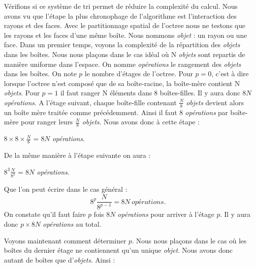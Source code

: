 Vérifions si ce système de tri permet de réduire la complexité du calcul. Nous avons vu que l'étape la plus chronophage de l'algorithme est l'interaction des rayons et des faces. Avec le partitionnage spatial de l'\gls{octree} nous ne testons que les rayons et les faces d'une même boîte. Nous nommons \textit{objet} : un rayon ou une face. Dans un premier temps, voyons la complexité de la répartition des \textit{objets} dans les boîtes. Nous nous plaçons dans le cas idéal où N \textit{objets} sont repartis de manière uniforme dans l'espace. On nomme \textit{opérations} le rangement des \textit{objets} dans les boîtes. On note $p$ le nombre d'étages de l'\gls{octree}. Pour $p=0$, c'est à dire lorsque l'\gls{octree} n'est composé que de sa boîte-racine, la boîte-mère contient N \textit{objets}. Pour $p=1$ il faut ranger N éléments dans 8 boîtes-filles. Il y aura donc $8N$ \textit{opérations}. A l'étage suivant, chaque boîte-fille contenant $\frac{N}{8}$ \textit{objets} devient alors un boîte mère traitée comme précédemment. Ainsi il faut $8$ \textit{opérations} par boîte-mère pour ranger leurs $\frac{N}{8}$ \textit{objets}. Nous avons donc à cette étape :
%
\begin{center}
$8\times 8\times \frac{N}{8}$ = $8N$ \textit{opérations}.
\end{center}
%
De la même manière à l'étape suivante on aura :
\begin{center}
$8^3\frac{N}{8^2}$ = $8N$ \textit{opérations}.
\end{center}
%
Que l'on peut écrire dans le cas général :
\begin{equation} \label{operation}
8^p\frac{N}{8^{p-1}} = 8N \ \textit{opérations}.
\end{equation}
%
On constate qu'il faut faire $p$ fois $8N$ \textit{opérations} pour arriver à l'étage $p$. Il y aura donc $p \times 8N$ \textit{opérations} au total. %

Voyons maintenant comment déterminer $p$. Nous nous plaçons dans le cas où les boîtes du dernier étage ne contiennent qu'un unique \textit{objet}. Nous avons donc autant de boîtes que d'\textit{objets}. Ainsi :

